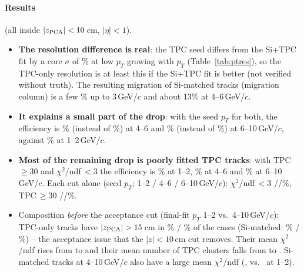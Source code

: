 \paragraph{Results} (all inside $|z_{\rm PCA}|<10$\,cm, $|\eta|<1$).
\begin{itemize}\itemsep0pt
\item \textbf{The resolution difference is real}: the TPC seed differs from the Si+TPC fit by a core
  $\sigma$ of \rResSiLow\% at low $p_T$ growing with $p_T$ (Table~\ref{tab:ptres}), so the TPC-only resolution
  is at least this if the Si+TPC fit is better (not verified without truth). The resulting migration of
  Si-matched tracks (migration column) is a few \% up to 3\,GeV/$c$ and about 13\% at 4--6\,GeV/$c$.
\item \textbf{It explains a small part of the drop}: with the seed $p_T$ for both, the efficiency is
  \rEffSeedFour\% (instead of \rEffFullFour\%) at 4--6 and \rEffSeedSix\% (instead of \rEffFullSix\%) at
  6--10\,GeV/$c$, against \rEffSeedOneTwo\% at 1--2\,GeV/$c$.
\item \textbf{Most of the remaining drop is poorly fitted TPC tracks}: with TPC\,$\geq30$ and
  $\chi^2$/ndf\,$<3$ the efficiency is \rEffQualOneTwo\% at 1--2, \rEffQualFour\% at 4--6 and \rEffQualSix\% at
  6--10\,GeV/$c$. Each cut alone (seed $p_T$; 1--2 / 4--6 / 6--10\,GeV/$c$): $\chi^2$/ndf\,$<3$
  \rEffCutChiOneTwo/\rEffCutChiFour/\rEffCutChiSix\%, TPC\,$\geq30$ \rEffCutNtpcOneTwo/\rEffCutNtpcFour/\rEffCutNtpcSix\%.
\item Composition \emph{before} the acceptance cut (final-fit $p_T$ 1--2 vs.\ 4--10\,GeV/$c$): TPC-only tracks
  have $|z_{\rm PCA}|>15$\,cm in \rCompZTpcOneTwo\% / \rCompZTpcFourTen\% of the cases (Si-matched:
  \rCompZSiOneTwo\% / \rCompZSiFourTen\%) -- the acceptance issue that the $|z|<10$\,cm cut removes. Their mean
  $\chi^2$/ndf rises from \rCompChiTpcOneTwo{} to \rCompChiTpcFourTen{} and their mean number of TPC clusters falls
  from \rCompNtpcTpcOneTwo{} to \rCompNtpcTpcFourTen. Si-matched tracks at 4--10\,GeV/$c$ also have a large mean
  $\chi^2$/ndf (\rCompChiSiFourTen, vs.\ \rCompChiSiOneTwo{} at 1--2).
\end{itemize}


